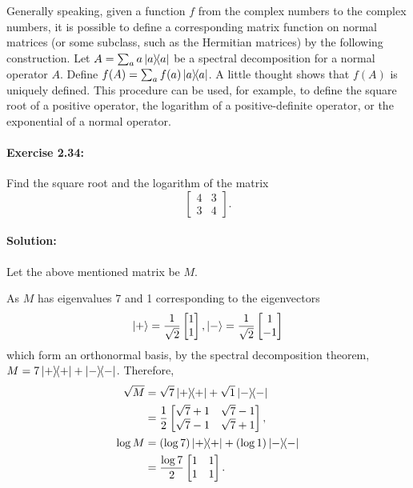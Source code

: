 Generally speaking, given a function $f$ from the complex numbers to the
complex numbers, it is possible to define a corresponding matrix function on
normal matrices (or some subclass, such as the Hermitian matrices) by the
following construction. Let $A = \sum_a a\ketbra{a}{a}$ be a spectral
decomposition for a normal operator $A$. Define $f(A) = \sum_a f(a)
\ketbra{a}{a}$. A little thought shows that $f(A)$ is uniquely defined. This
procedure can be used, for example, to define the square root of a positive
operator, the logarithm of a positive-definite operator, or the exponential
of a normal operator.

\paragraph{\cite{mikeandike} Exercise 2.34:} Find the square root and the
logarithm of the matrix \begin{equation*}
  \begin{bmatrix}
    4 & 3 \\
    3 & 4
  \end{bmatrix}.
\end{equation*}

\paragraph{Solution:} Let the above mentioned matrix be $M$.

As $M$ has eigenvalues 7 and 1 corresponding to the eigenvectors
\begin{equation*}
  \ket{+} = \frac{1}{\sqrt{2}}\begin{bmatrix}1 \\ 1\end{bmatrix},
  \ket{-} = \frac{1}{\sqrt{2}}\begin{bmatrix}1 \\ -1\end{bmatrix}
\end{equation*} which form an orthonormal basis, by the spectral decomposition
theorem, $M = 7\ketbra{+}{+} + \ketbra{-}{-}$. Therefore, \begin{align*}
  \sqrt{M}
  &= \sqrt{7}\ketbra{+}{+} + \sqrt{1}\ketbra{-}{-} \\
  &= \frac{1}{2}\begin{bmatrix}
      \sqrt{7} + 1 & \sqrt{7} - 1 \\
      \sqrt{7} - 1 & \sqrt{7} + 1
    \end{bmatrix}, \\
  \log{M}
  &= (\log{7})\ketbra{+}{+} + (\log{1})\ketbra{-}{-} \\
  &= \frac{\log{7}}{2}\begin{bmatrix}
    1 & 1 \\
    1 & 1
  \end{bmatrix}.
\end{align*}

